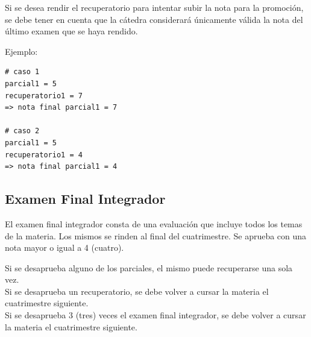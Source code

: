 \documentclass[
  letterpaper,
  DIV=11,
  numbers=noendperiod]{scrreprt}
\begin{document}
\begin{tcolorbox}[enhanced jigsaw, arc=.35mm, toptitle=1mm, colframe=quarto-callout-tip-color-frame, bottomtitle=1mm, opacitybacktitle=0.6, colbacktitle=quarto-callout-tip-color!10!white, leftrule=.75mm, coltitle=black, toprule=.15mm, titlerule=0mm, title=\textcolor{quarto-callout-tip-color}{\faLightbulb}\hspace{0.5em}{Rendir Recuperatorios para Promoción}, bottomrule=.15mm, rightrule=.15mm, colback=white, breakable, opacityback=0, left=2mm]

Si se desea rendir el recuperatorio para intentar subir la nota para la
promoción, se debe tener en cuenta que la cátedra considerará únicamente
válida la nota del último examen que se haya rendido.

Ejemplo:

\begin{verbatim}
# caso 1
parcial1 = 5
recuperatorio1 = 7
=> nota final parcial1 = 7

# caso 2
parcial1 = 5
recuperatorio1 = 4
=> nota final parcial1 = 4
\end{verbatim}

\end{tcolorbox}

\subsection*{Examen Final Integrador}\label{examen-final-integrador}

El examen final integrador consta de una evaluación que incluye todos
los temas de la materia. Los mismos se rinden al final del cuatrimestre.
Se aprueba con una nota mayor o igual a 4 (cuatro).

\begin{tcolorbox}[enhanced jigsaw, arc=.35mm, toptitle=1mm, colframe=quarto-callout-warning-color-frame, bottomtitle=1mm, opacitybacktitle=0.6, colbacktitle=quarto-callout-warning-color!10!white, leftrule=.75mm, coltitle=black, toprule=.15mm, titlerule=0mm, title=\textcolor{quarto-callout-warning-color}{\faExclamationTriangle}\hspace{0.5em}{Desaprobación de la Materia}, bottomrule=.15mm, rightrule=.15mm, colback=white, breakable, opacityback=0, left=2mm]

Si se desaprueba alguno de los parciales, el mismo puede recuperarse una
sola vez.\\
Si se desaprueba un recuperatorio, se debe volver a cursar la materia el
cuatrimestre siguiente.\\
Si se desaprueba 3 (tres) veces el examen final integrador, se debe
volver a cursar la materia el cuatrimestre siguiente.

\end{tcolorbox}
\end{document}

